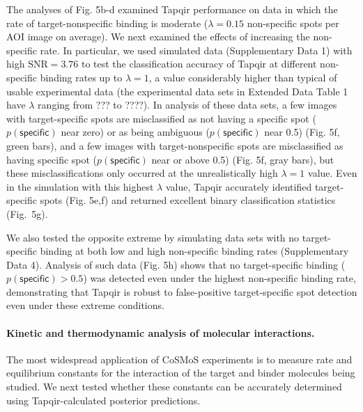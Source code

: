 The analyses of Fig. 5b-d examined Tapqir performance on data in which the rate of target-nonspecific binding is moderate ($\lambda = 0.15$ non-specific spots per AOI image on average).  We next examined the effects of increasing the non-specific rate.  In particular, we used simulated data (Supplementary Data 1) with high $\textrm{SNR} = 3.76$ to test the classification accuracy of Tapqir at different non-specific binding rates up to $\lambda = 1$, a value considerably higher than typical of usable experimental data (the experimental data sets in Extended Data Table 1 have $\lambda$ ranging from ??? to ????).   In analysis of these data sets, a few images with target-specific spots are misclassified as not having a specific spot ($p(\mathsf{specific})$ near zero) or as being ambiguous ($p(\mathsf{specific})$ near 0.5) (Fig. 5f, green bars), and a few images with target-nonspecific spots are misclassified as having specific spot ($p(\mathsf{specific})$ near or above 0.5) (Fig. 5f, gray bars), but these misclassifications only occurred at the unrealistically high $\lambda = 1$ value.  Even in the simulation with this highest $\lambda$ value, Tapqir accurately identified target-specific spots (Fig. 5e,f) and returned excellent binary classification statistics (Fig.~5g). 

We also tested the opposite extreme by simulating data sets with no target-specific binding at both low and high non-specific binding rates (Supplementary Data 4). Analysis of such data (Fig. 5h) shows that no target-specific binding ($p(\mathsf{specific}) > 0.5$) was detected even under the highest non-specific binding rate, demonstrating that Tapqir is robust to false-positive target-specific spot detection even under these extreme conditions. 

\paragraph{Kinetic and thermodynamic analysis of molecular interactions.}
The most widespread application of CoSMoS experiments is to measure rate and equilibrium constants for the interaction of the target and binder molecules being studied.  We next tested whether these constants can be accurately determined using Tapqir-calculated posterior predictions. 

